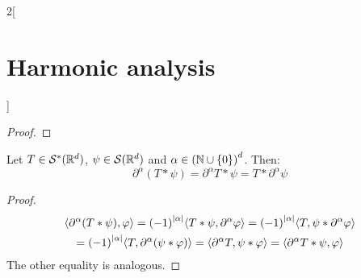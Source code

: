 \documentclass[../../../main_math.tex]{subfiles}
\begin{document}
\begin{multicols}{2}[\section{Harmonic analysis}]
\begin{proof}
  \end{proof}
  \begin{lemma}
    Let $T\in \mathcal{S}^*(\mathbb{R}^d)$, $\psi\in \mathcal{S}(\mathbb{R}^d)$ and $\alpha\in{(\ensuremath{\mathbb{N}}\cup\{0\})}^d$. Then:
    $$
      \partial^\alpha(T*\psi)=\partial^\alpha T*\psi=T*\partial^\alpha\psi
    $$
  \end{lemma}
  \begin{proof}
    \begin{multline*}
      \langle \partial^\alpha(T*\psi),\varphi\rangle={(-1)}^{\abs{\alpha}}\langle T*\psi,\partial^\alpha\varphi\rangle={(-1)}^{\abs{\alpha}}\langle T,\psi*\partial^\alpha\varphi\rangle\\={(-1)}^{\abs{\alpha}}\langle T,\partial^\alpha(\psi*\varphi)\rangle
      =\langle \partial^\alpha T,\psi*\varphi\rangle   =\langle \partial^\alpha T*\psi,\varphi\rangle
    \end{multline*}
    The other equality is analogous.
  \end{proof}

\end{multicols}
\end{document}
